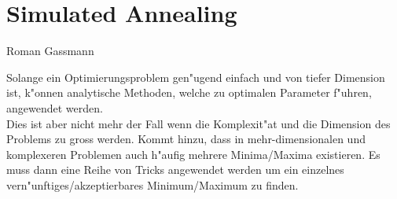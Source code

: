 %
%
%

\chapter{Simulated Annealing}
Roman Gassmann
\bigskip
\bigskip

	Solange ein Optimierungsproblem gen"ugend einfach und von tiefer Dimension ist, 
	k"onnen analytische Methoden, welche zu optimalen Parameter f"uhren, angewendet werden.\\
	Dies ist aber nicht mehr der Fall wenn die Komplexit"at und die Dimension des Problems zu gross werden.
	Kommt hinzu, dass in mehr-dimensionalen und komplexeren Problemen auch h"aufig mehrere Minima/Maxima existieren. Es muss dann eine Reihe von Tricks angewendet werden um ein einzelnes vern"unftiges/akzeptierbares Minimum/Maximum zu finden.
	
